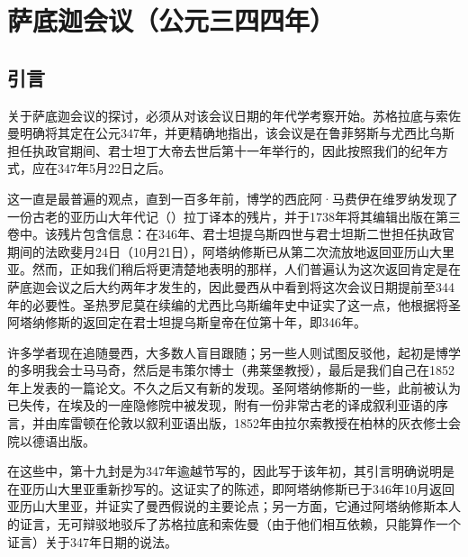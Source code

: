 
\chapter{萨底迦会议（公元三​四四年）}



\section{引言}

关于萨底迦会议的探讨，必须从对该会议日期的年代学考察开始。苏格拉底与索佐曼明确将其定在公元347年，并更精确地指出，该会议是在鲁菲努斯与尤西比乌斯担任执政官期间、君士坦丁大帝去世后第十一年举行的，因此按照我们的纪年方式，应在347年5月22日之后。\par

这一直是最普遍的观点，直到一百多年前，博学的西庇阿·马费伊在维罗纳发现了一份古老的亚历山大年代记（）拉丁译本的残片，并于1738年将其编辑出版在第三卷中。该残片包含信息：在346年、君士坦提乌斯四世与君士坦斯二世担任执政官期间的法欧斐月24日（10月21日），阿塔纳修斯已从第二次流放地返回亚历山大里亚。然而，正如我们稍后将更清楚地表明的那样，人们普遍认为这次返回肯定是在萨底迦会议之后大约两年才发生的，因此曼西从中看到将这次会议日期提前至344年的必要性。圣热罗尼莫在续编的尤西比乌斯编年史中证实了这一点，他根据将圣阿塔纳修斯的返回定在君士坦提乌斯皇帝在位第十年，即346年。\par

许多学者现在追随曼西，大多数人盲目跟随；另一些人则试图反驳他，起初是博学的多明我会士马马奇，然后是韦策尔博士（弗莱堡教授），最后是我们自己在1852年上发表的一篇论文。不久之后又有新的发现。圣阿塔纳修斯的一些，此前被认为已失传，在埃及的一座隐修院中被发现，附有一份非常古老的译成叙利亚语的序言，并由库雷顿在伦敦以叙利亚语出版，1852年由拉尔索教授在柏林的灰衣修士会院以德语出版。\par

在这些中，第十九封是为347年逾越节写的，因此写于该年初，其引言明确说明是在亚历山大里亚重新抄写的。这证实了的陈述，即阿塔纳修斯已于346年10月返回亚历山大里亚，并证实了曼西假说的主要论点；另一方面，它通过阿塔纳修斯本人的证言，无可辩驳地驳斥了苏格拉底和索佐曼（由于他们相互依赖，只能算作一个证言）关于347年日期的说法。\par

